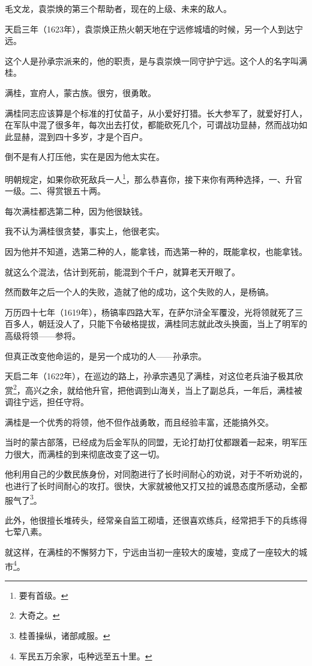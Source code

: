 \begin{multicols}{\theparacolNo}
毛文龙，袁崇焕的第三个帮助者，现在的上级、未来的敌人。

天启三年（1623年），袁崇焕正热火朝天地在宁远修城墙的时候，另一个人到达宁远。

这个人是孙承宗派来的，他的职责，是与袁崇焕一同守护宁远。这个人的名字叫满桂。

满桂，宣府人，蒙古族。很穷，很勇敢。

满桂同志应该算是个标准的打仗苗子，从小爱好打猎。长大参军了，就爱好打人，在军队中混了很多年，每次出去打仗，都能砍死几个，可谓战功显赫，然而战功如此显赫，混到四十多岁，才是个百户。

倒不是有人打压他，实在是因为他太实在。

明朝规定，如果你砍死敌兵一人\footnote{要有首级。}，那么恭喜你，接下来你有两种选择，一、升官一级。二、得赏银五十两。

每次满桂都选第二种，因为他很缺钱。

我不认为满桂很贪婪，事实上，他很老实。

因为他并不知道，选第二种的人，能拿钱，而选第一种的，既能拿权，也能拿钱。

就这么个混法，估计到死前，能混到个千户，就算老天开眼了。

然而数年之后一个人的失败，造就了他的成功，这个失败的人，是杨镐。

万历四十七年（1619年），杨镐率四路大军，在萨尔浒全军覆没，光将领就死了三百多人，朝廷没人了，只能下令破格提拔，满桂同志就此改头换面，当上了明军的高级将领——参将。

但真正改变他命运的，是另一个成功的人——孙承宗。

天启二年（1622年），在巡边的路上，孙承宗遇见了满桂，对这位老兵油子极其欣赏\footnote{大奇之。}，高兴之余，就给他升官，把他调到山海关，当上了副总兵，一年后，满桂被调往宁远，担任守将。

满桂是一个优秀的将领，他不但作战勇敢，而且经验丰富，还能搞外交。

当时的蒙古部落，已经成为后金军队的同盟，无论打劫打仗都跟着一起来，明军压力很大，而满桂的到来彻底改变了这一切。

他利用自己的少数民族身份，对同胞进行了长时间耐心的劝说，对于不听劝说的，也进行了长时间耐心的攻打。很快，大家就被他又打又拉的诚恳态度所感动，全都服气了\footnote{桂善操纵，诸部咸服。}。

此外，他很擅长堆砖头，经常亲自监工砌墙，还很喜欢练兵，经常把手下的兵练得七荤八素。

就这样，在满桂的不懈努力下，宁远由当初一座较大的废墟，变成了一座较大的城市\footnote{军民五万余家，屯种远至五十里。}。


\end{multicols}
